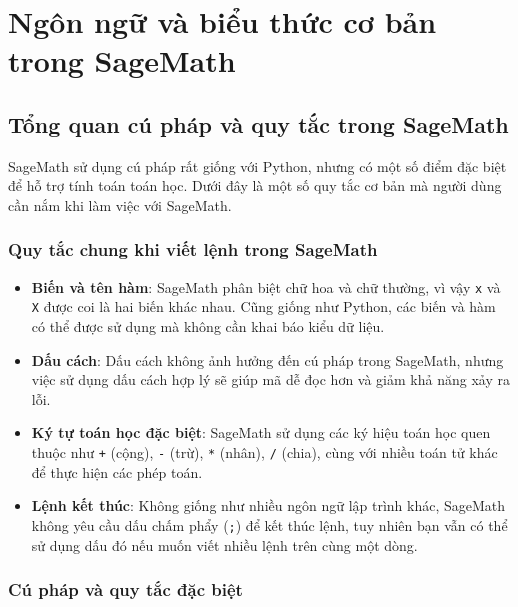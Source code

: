 \section{Ngôn ngữ và biểu thức cơ bản trong SageMath}
\subsection{Tổng quan cú pháp và quy tắc trong SageMath}

SageMath sử dụng cú pháp rất giống với Python, nhưng có một số điểm đặc biệt để hỗ trợ tính toán toán học. Dưới đây là một số quy tắc cơ bản mà người dùng cần nắm khi làm việc với SageMath.\\

\subsubsection{Quy tắc chung khi viết lệnh trong SageMath}
\begin{itemize}
	\item \textbf{Biến và tên hàm}: SageMath phân biệt chữ hoa và chữ thường, vì vậy \texttt{x} và \texttt{X} được coi là hai biến khác nhau. Cũng giống như Python, các biến và hàm có thể được sử dụng mà không cần khai báo kiểu dữ liệu.
	
	\item \textbf{Dấu cách}: Dấu cách không ảnh hưởng đến cú pháp trong SageMath, nhưng việc sử dụng dấu cách hợp lý sẽ giúp mã dễ đọc hơn và giảm khả năng xảy ra lỗi.
	
	\item \textbf{Ký tự toán học đặc biệt}: SageMath sử dụng các ký hiệu toán học quen thuộc như \texttt{+} (cộng), \texttt{-} (trừ), \texttt{*} (nhân), \texttt{/} (chia), cùng với nhiều toán tử khác để thực hiện các phép toán.
	
	\item \textbf{Lệnh kết thúc}: Không giống như nhiều ngôn ngữ lập trình khác, SageMath không yêu cầu dấu chấm phẩy (\texttt{;}) để kết thúc lệnh, tuy nhiên bạn vẫn có thể sử dụng dấu đó nếu muốn viết nhiều lệnh trên cùng một dòng.
\end{itemize}



\subsubsection{Cú pháp và quy tắc đặc biệt}

